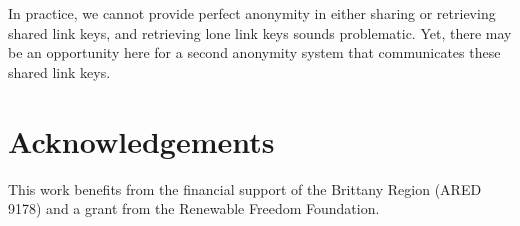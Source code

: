 \documentclass[twoside,letterpaper]{llncs}
\begin{document}
In practice, we cannot provide perfect anonymity in either sharing or
retrieving shared link keys, and retrieving lone link keys sounds
problematic.  Yet, there may be an opportunity here for a second
anonymity system that communicates these shared link keys.


\section*{Acknowledgements}

This work benefits from the financial support of the Brittany Region
(ARED 9178) and a grant from the Renewable Freedom Foundation.




\end{document}
